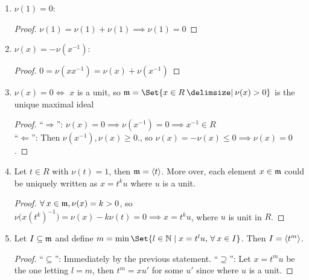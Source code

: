 \begin{prop} \hfill \label{prop:property-of-dvr}
\begin{enumerate}
  \item $\nu(1) = 0$:
    \begin{proof}
      $\nu(1) = \nu(1) + \nu(1) \implies \nu(1) = 0$
    \end{proof}
  \item $\nu(x) = -\nu(x^{-1})$:
    \begin{proof}
      $0 = \nu(xx^{-1}) = \nu(x) + \nu(x^{-1})$
    \end{proof}
  \item $\nu(x) = 0 \iff$ $x$ is a unit,
    so $\mf = \Set{x \in R \given \nu(x) > 0}$ is the unique maximal ideal
    \begin{proof}
      ``$\Rightarrow$'': $\nu(x) = 0 \implies \nu(x^{-1}) = 0 \implies x^{-1} \in R$ \\
      ``$\Leftarrow$'':
        Then $\nu(x^{-1}), \nu(x) \ge 0.$, so $\nu(x) = -\nu(x) \le 0 \implies
        \nu(x) = 0$.
    \end{proof}
  \item Let $t \in R$ with $\nu(t) = 1$, then $\mathfrak{m} = \langle t\rangle$.
    More over, each element $x \in \mathfrak{m}$ could be uniquely written as $x = t^k u$
    where $u$ is a unit.
    \begin{proof}
      $\forall x \in \mf, \nu(x) = k > 0$, so $\nu\big(x(t^k)^{-1}\big) =
      \nu(x) - k\nu(t) = 0 \implies x = t^ku$, where $u$ is unit in $R$.
    \end{proof}
  \item Let $I \subseteq \mathfrak{m}$ and define
    $m = \min\Set{l \in \Nb \mid x = t^l u, \, \forall x \in I}$.
    Then $I = \langle t^m\rangle$.
    \begin{proof}
      ``$\subseteq$'': Immediately by the previous statement.
      ``$\supseteq$'': Let $x = t^m u$ be the one letting $l = m$,
      then $t^m = x u'$ for some $u'$ since where $u$ is a unit.
    \end{proof}
\end{enumerate}
\end{prop}

